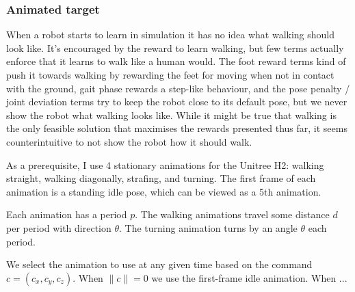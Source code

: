 \documentclass[11pt]{article}
\begin{document}
\subsubsection{Animated target}
When a robot starts to learn in simulation it has no idea what walking should look like. It's encouraged by the reward to learn walking, but few terms actually enforce that it learns to walk like a human would. The foot reward terms kind of push it towards walking by rewarding the feet for moving when not in contact with the ground, gait phase rewards a step-like behaviour, and the pose penalty / joint deviation terms try to keep the robot close to its default pose, but we never show the robot what walking looks like. While it might be true that walking is the only feasible solution that maximises the rewards presented thus far, it seems counterintuitive to not show the robot how it should walk.

As a prerequisite, I use 4 stationary animations for the Unitree H2: walking straight, walking diagonally, strafing, and turning. The first frame of each animation is a standing idle pose, which can be viewed as a 5th animation.

Each animation has a period $p$. The walking animations travel some distance $d$ per period with direction $\theta$. The turning animation turns by an angle $\theta$ each period.

We select the animation to use at any given time based on the command $c = (c_x, c_y,c_z)$. When $\|c\| = 0$ we use the first-frame idle animation. When ...
\end{document}

